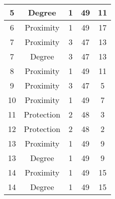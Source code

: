 \documentclass[results.tex]{subfiles}
\begin{document}
\begin{center}
\begin{tabular}{| c || c | c | c | c |}
            \hline
            5                       & Degree                       & 1                      & 49                      & 11                   \\
            \hline
            6                       & Proximity                    & 1                      & 49                      & 17                   \\
            \hline
            7                       & Proximity                    & 3                      & 47                      & 13                   \\
            \hline
            7                       & Degree                       & 3                      & 47                      & 13                   \\
            \hline
            8                       & Proximity                    & 1                      & 49                      & 11                   \\
            \hline
            9                       & Proximity                    & 3                      & 47                      & 5                    \\
            \hline
            10                      & Proximity                    & 1                      & 49                      & 7                    \\
            \hline
            11                      & Protection                   & 2                      & 48                      & 3                    \\
            \hline
            12                      & Protection                   & 2                      & 48                      & 2                    \\
            \hline
            13                      & Proximity                    & 1                      & 49                      & 9                    \\
            \hline
            13                      & Degree                       & 1                      & 49                      & 9                    \\
            \hline
            14                      & Proximity                    & 1                      & 49                      & 15                   \\
            \hline
            14                      & Degree                       & 1                      & 49                      & 15                   \\

\end{tabular}
\end{center}
\end{document}
